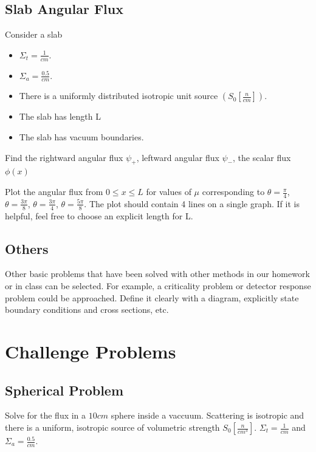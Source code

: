 \documentclass[11pt]{exam}
\begin{document}
        \subsection{Slab Angular Flux}
        Consider a slab
        \begin{itemize}
                \item $\Sigma_t = \frac{1}{cm}$.
                \item $\Sigma_a = \frac{0.5}{cm}$.
                \item There is a uniformly distributed isotropic unit source $\left(S_0\left[\frac{n}{cm}\right]\right)$.
                \item The slab has length L
                \item The slab has vacuum boundaries.
        \end{itemize}

        Find the rightward angular flux $\psi_+$, leftward angular
        flux $\psi_-$, the scalar flux $\phi(x)$

        Plot the angular flux from $0\le x \le L$ for values of $\mu$ corresponding to
        $\theta = \frac{\pi}{4}$,
        $\theta = \frac{3\pi}{8}$,
        $\theta = \frac{3\pi}{4}$,
        $\theta = \frac{5\pi}{8}$. The plot should contain 4 lines on a single
        graph. If it is helpful, feel free to choose an explicit length for L.

        \subsection{Others}
        Other basic problems that have been solved with other methods in our 
        homework or in class can be selected. For example, a criticality 
        problem or detector response problem could be approached. Define it 
        clearly with a diagram, explicitly state boundary conditions and cross 
        sections, etc.

        \section{Challenge Problems}\label{sec:challenge}
        \subsection{Spherical Problem} Solve for the flux in a $10cm$ sphere 
        inside a vaccuum. Scattering is isotropic and there is a uniform, 
        isotropic source of volumetric strength $S_0 
        \left[\frac{n}{cm^3}\right]$. $\Sigma_t = \frac{1}{cm}$ and  $\Sigma_a = \frac{0.5}{cm}$.
\end{document}
